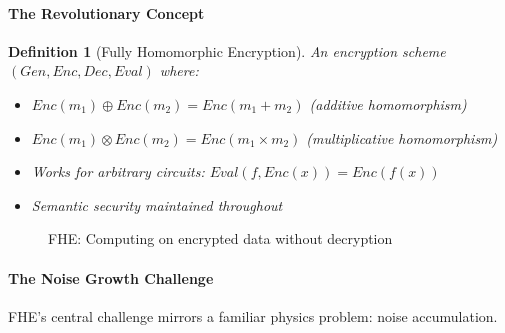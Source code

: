 \documentclass[11pt,a4paper]{article}
\newtheorem{definition}{Definition}
\begin{document}
\paragraph{The Revolutionary Concept}

\begin{definition}[Fully Homomorphic Encryption]
An encryption scheme $(Gen, Enc, Dec, Eval)$ where:
\begin{itemize}
    \item $Enc(m_1) \oplus Enc(m_2) = Enc(m_1 + m_2)$ (additive homomorphism)
    \item $Enc(m_1) \otimes Enc(m_2) = Enc(m_1 \times m_2)$ (multiplicative homomorphism)
    \item Works for arbitrary circuits: $Eval(f, Enc(x)) = Enc(f(x))$
    \item Semantic security maintained throughout
\end{itemize}
\end{definition}

\begin{figure}[h]
\centering
{}
\caption{FHE: Computing on encrypted data without decryption}
\end{figure}

\paragraph{The Noise Growth Challenge}

FHE's central challenge mirrors a familiar physics problem: noise accumulation.
\end{document}
